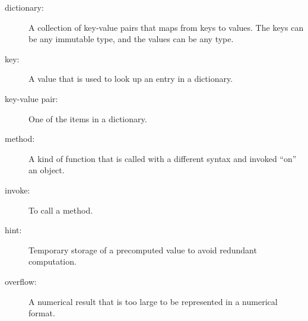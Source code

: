 \begin{description}

\item[dictionary:] A collection of key-value pairs that maps from
keys to values.
The keys can be any immutable type, and the values can be any type.

\item[key:] A value that is used to look up an entry in a dictionary.

\item[key-value pair:] One of the items in a dictionary.

\item[method:] A kind of function that is called with a different syntax and
invoked ``on'' an object.

\item[invoke:] To call a method.

\item[hint:] Temporary storage of a precomputed value to avoid redundant
computation.

\item[overflow:] A numerical result that is too large to be represented
in a numerical format.


\end{description}

